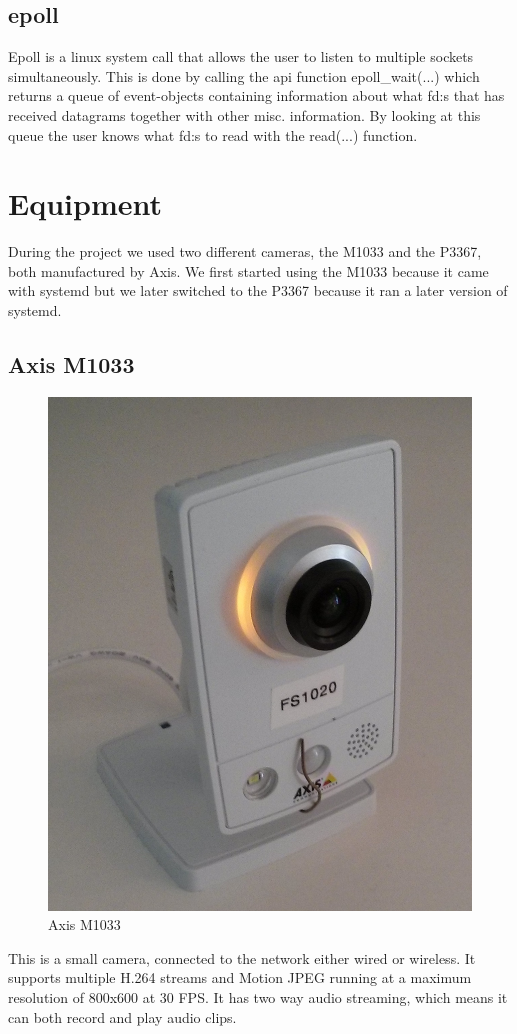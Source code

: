 \documentclass[nobiblatex]{LTHthesis}
\begin{document}
\subsection{epoll}
Epoll is a linux system call that allows the user to listen to multiple sockets simultaneously. This is done by calling the api function epoll\_wait(...) which returns a queue of event-objects containing information about what fd:s that has received datagrams together with other misc. information. By looking at this queue the user knows what fd:s to read with the read(...) function.  


\section{Equipment} %
During the project we used two different cameras, the M1033 and the P3367, both manufactured by Axis. We first started using the M1033 because it came with systemd but we later switched to the P3367 because it ran a later version of systemd.

\subsection{Axis M1033}
\begin{figure}
    \centering
    \includegraphics[width=\textwidth]{m1033}
    \caption{Axis M1033}
    \label{fig:M1033}
\end{figure}
This is a small camera, connected to the network either wired or wireless. It supports multiple H.264 streams and Motion JPEG running at a maximum resolution of 800x600 at 30 FPS. It has two way audio streaming, which means it can both record and play audio clips.
\end{document}
